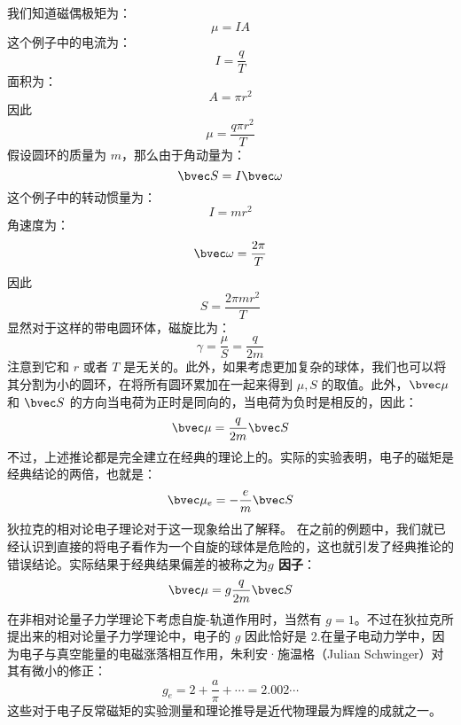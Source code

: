 我们知道磁偶极矩为：
\begin{equation}
\mu = IA
\end{equation}
这个例子中的电流为：
\begin{equation}
I=\frac{q}{T}
\end{equation}
面积为：
\begin{equation}
A= \pi r^2
\end{equation}
因此
\begin{equation}
\mu=\frac{q\pi r^2}{T}
\end{equation}
假设圆环的质量为 $m$，那么由于角动量为：
\begin{equation}
\bvec S = I\bvec\omega
\end{equation}
这个例子中的转动惯量为：
\begin{equation}
I = mr^2
\end{equation}
角速度为：
\begin{equation}
\bvec \omega = \frac{2\pi}{T}
\end{equation}
因此
\begin{equation}
S = \frac{2\pi m r^2}{T}
\end{equation}
显然对于这样的带电圆环体，磁旋比为：
\begin{equation}
\gamma = \frac{\mu}{S} = \frac{q}{2m}
\end{equation}
注意到它和 $r$ 或者 $T$ 是无关的。此外，如果考虑更加复杂的球体，我们也可以将其分割为小的圆环，在将所有圆环累加在一起来得到 $\mu,S$ 的取值。此外，$\bvec \mu$ 和 $\bvec S$ 的方向当电荷为正时是同向的，当电荷为负时是相反的，因此：
\begin{equation}
\bvec \mu = \frac{q}{2m}\bvec S
\end{equation}
不过，上述推论都是完全建立在经典的理论上的。实际的实验表明，电子的磁矩是经典结论的两倍，也就是：
\begin{equation}
\bvec \mu_e = -\frac{e}{m}\bvec S
\end{equation}
狄拉克的相对论电子理论对于这一现象给出了解释。
在之前的例题中，我们就已经认识到直接的将电子看作为一个自旋的球体是危险的，这也就引发了经典推论的错误结论。实际结果于经典结果偏差的被称之为\textbf{$g$ 因子}：
\begin{equation}\label{HfineS_eq43}
\bvec \mu = g\frac{q}{2m}\bvec S
\end{equation}
在非相对论量子力学理论下考虑自旋-轨道作用时，当然有 $g=1$。不过在狄拉克所提出来的相对论量子力学理论中，电子的 $g$ 因此恰好是 $2$.在量子电动力学中，因为电子与真空能量的电磁涨落相互作用，朱利安·施温格（Julian Schwinger）对其有微小的修正：
\begin{equation}
g_e = 2+\frac{a}{\pi}+\cdots = 2.002\cdots
\end{equation}
这些对于电子反常磁矩的实验测量和理论推导是近代物理最为辉煌的成就之一。

